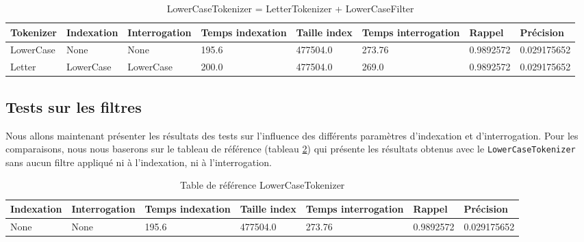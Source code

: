 \begin{table}[!htbp]
    \hspace{-2.5cm}
                \begin{tabular}{|p{2cm}|p{2cm}|p{2.5cm}|p{2cm}|p{2cm}|p{2.5cm}|p{1.7cm}|p{1.7cm}|}
                    \hline
                    \textbf{Tokenizer} & \textbf{Indexation} & \textbf{Interrogation} & \textbf{Temps \mbox{indexation}} & \textbf{Taille \mbox{index}} & \textbf{Temps \mbox{interrogation}} & \textbf{Rappel} & \textbf{Précision}\\
                    \hline
LowerCase & None & None & 195.6 & 477504.0 & 273.76 & 0.9892572 & 0.029175652\\
		\hline
Letter & LowerCase & LowerCase & 200.0 & 477504.0 & 269.0 & 0.9892572 & 0.029175652\\
                    \hline
                \end{tabular}
                \caption{LowerCaseTokenizer = LetterTokenizer + LowerCaseFilter}
                \label{tab:tests_tokenizers_2}
            \end{table}

\subsection{Tests sur les filtres}
\label{section:filtrestest}

Nous allons maintenant présenter les résultats des tests sur l’influence des différents paramètres d’indexation et d’interrogation. Pour les comparaisons, nous nous baserons sur le tableau de référence (tableau \ref{tab:references}) qui présente les résultats obtenus avec le \texttt{LowerCaseTokenizer} sans aucun filtre appliqué ni à l’indexation, ni à l’interrogation.

\begin{table}[!htbp]
    \hspace{-2cm}
                \begin{tabular}{|p{2.5cm}|p{2.5cm}|p{2cm}|p{2cm}|p{2.5cm}|p{2cm}|p{2cm}|}
                    \hline
                    \textbf{Indexation} & \textbf{Interrogation} & \textbf{Temps \mbox{indexation}} & \textbf{Taille \mbox{index}} & \textbf{Temps \mbox{interrogation}} & \textbf{Rappel} & \textbf{Précision}\\
                    \hline
                    None & None & 195.6 & 477504.0 & 273.76 & 0.9892572 & 0.029175652\\
                    \hline
                \end{tabular}
                \caption{Table de référence LowerCaseTokenizer}
                \label{tab:references}
            \end{table}

